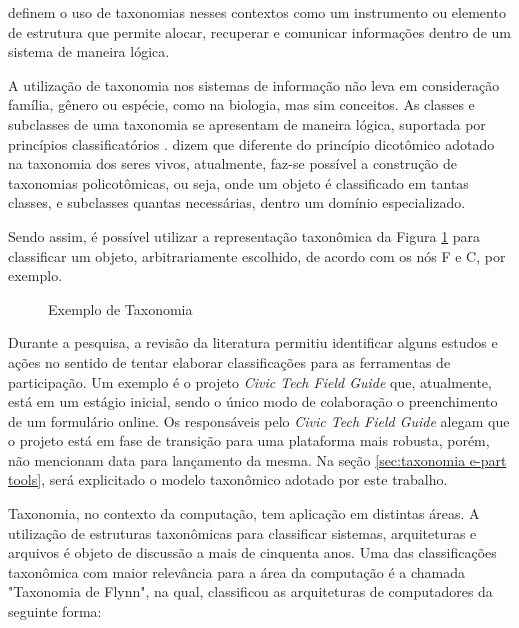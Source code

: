  definem o uso de taxonomias nesses contextos como um instrumento ou elemento de estrutura que permite alocar,
recuperar e comunicar informações dentro de um sistema de maneira lógica.

\par
A utilização de taxonomia nos sistemas de informação não leva em consideração família, gênero ou espécie, como na biologia, mas sim conceitos.
As classes e subclasses de uma taxonomia se apresentam de maneira lógica, suportada por princípios classificatórios \cite{campos2012taxonomia}.
 dizem que diferente do princípio dicotômico adotado na taxonomia dos seres vivos, atualmente, faz-se possível a construção de taxonomias
policotômicas, ou seja, onde um objeto é classificado em tantas classes, e subclasses quantas necessárias, dentro um domínio especializado.

\par
Sendo assim, é possível utilizar a representação taxonômica da Figura \ref{fig:exemploTaxonomia} para classificar um objeto, arbitrariamente escolhido,
de acordo com os nós F e C, por exemplo.

\begin{figure}[!ht]
\caption{Exemplo de Taxonomia}
\label{fig:exemploTaxonomia}  
\end{figure}

\par
Durante a pesquisa, a revisão da literatura permitiu identificar alguns estudos e ações no sentido de tentar elaborar classificações para as ferramentas de participação.
Um exemplo é o projeto \textit{Civic Tech Field Guide} que, atualmente, está em um estágio inicial, sendo o único modo de colaboração o preenchimento de um formulário online. 
Os responsáveis pelo \textit{Civic Tech Field Guide} alegam que o projeto está em fase de transição para uma plataforma mais robusta, porém, não mencionam data para lançamento da mesma. 
Na seção \ref{sec:taxonomia e-part tools}, será explicitado o modelo taxonômico adotado por este trabalho.

\par
Taxonomia, no contexto da computação, tem aplicação em distintas áreas. A utilização de estruturas taxonômicas para classificar sistemas, arquiteturas e arquivos é objeto de discussão a mais de cinquenta anos. 
Uma das classificações taxonômica com maior relevância para a área da computação é a chamada "Taxonomia de Flynn",
na qual,  classificou as arquiteturas de computadores da seguinte forma:\\


